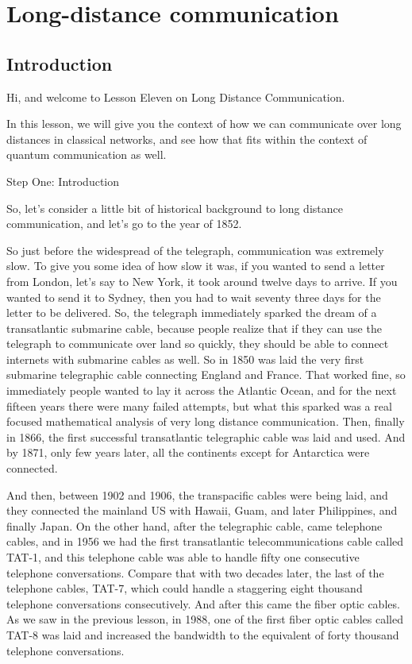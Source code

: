 \chapter{Long-distance communication}

\section{Introduction}

Hi, and welcome to Lesson Eleven on Long Distance Communication.

In this lesson, we will give you the context of how we can communicate over long distances in classical networks, and see how that fits within the context of quantum communication as well.

Step One: Introduction

So, let's consider a little bit of historical background to long distance communication, and let's go to the year of 1852.

So just before the widespread of the telegraph, communication was extremely slow. To give you some idea of how slow it was, if you wanted to send a letter from London, let's say to New York, it took around twelve days to arrive. If you wanted to send it to Sydney, then you had to wait seventy three days for the letter to be delivered. So, the telegraph immediately sparked the dream of a transatlantic submarine cable, because people realize that if they can use the telegraph to communicate over land so quickly, they should be able to connect internets with submarine cables as well. So in 1850 was laid the very first submarine telegraphic cable connecting England and France. That worked fine, so immediately people wanted to lay it across the Atlantic Ocean, and for the next fifteen years there were many failed attempts, but what this sparked was a real focused mathematical analysis of very long distance communication. Then, finally in 1866, the first successful transatlantic telegraphic cable was laid and used. And by 1871, only few years later, all the continents except for Antarctica were connected.

And then, between 1902 and 1906, the transpacific cables were being laid, and they connected the mainland US with Hawaii, Guam, and later Philippines, and finally Japan. On the other hand, after the telegraphic cable, came telephone cables, and in 1956 we had the first transatlantic telecommunications cable called TAT-1, and this telephone cable was able to handle fifty one consecutive telephone conversations. Compare that with two decades later, the last of the telephone cables, TAT-7, which could handle a staggering eight thousand telephone conversations consecutively. And after this came the fiber optic cables. As we saw in the previous lesson, in 1988, one of the first fiber optic cables called TAT-8 was laid and increased the bandwidth to the equivalent of forty thousand telephone conversations.

